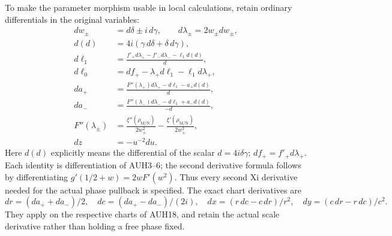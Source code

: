 \documentclass[11pt]{article}
\begin{document}
To make the parameter morphism usable in local calculations, retain
ordinary differentials in the original variables:
\[
\begin{aligned}
 dw_\pm&=d\delta\pm i\,d\gamma,\qquad
 d\lambda_\pm=2w_\pm dw_\pm,\\
 d(d)&=4i(\gamma\,d\delta+\delta\,d\gamma),\\
 d\ell_1&=\frac{f'_+d\lambda_+-f'_-d\lambda_--\ell_1d(d)}{d},\\
 d\ell_0&=df_+-\lambda_+d\ell_1-\ell_1d\lambda_+,\\
 da_+&=\frac{F''(\lambda_+)d\lambda_+-d\ell_1-a_+d(d)}{d},\\
 da_-&=\frac{F''(\lambda_-)d\lambda_--d\ell_1+a_-d(d)}{-d},\\
 F''(\lambda_\pm)&=
   \frac{\xi''(\rho_{\mathrm M/\mathrm N})}{2w_\pm^2}
  -\frac{\xi'(\rho_{\mathrm M/\mathrm N})}{2w_\pm^3},\\
 dz&=-u^{-2}du.
\end{aligned}\tag{AUH27}
\]
Here $d(d)$ explicitly means the differential of the scalar
$d=4i\delta\gamma$; $df_+=f'_+d\lambda_+$.
Each identity is differentiation of AUH3--6; the second derivative
formula follows by differentiating $g'(1/2+w)=2wF'(w^2)$.
Thus every second Xi derivative needed for the actual phase
pullback is specified.  The exact chart derivatives are
\[
 dr=(da_++da_-)/2,\quad dc=(da_+-da_-)/(2i),\quad
 dx=(r\,dc-c\,dr)/r^2,\quad
 dy=(c\,dr-r\,dc)/c^2.
 \tag{AUH28}
\]
They apply on the respective charts of AUH18, and retain the
actual scale derivative rather than holding a free phase fixed.
\end{document}
